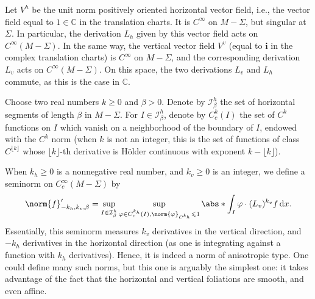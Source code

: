\documentclass[11pt, a4paper, oneside, final, pagebackref]{amsart}
\newcommand{\boI}{\mathcal{I}}
\newcommand{\C}{\mathbb{C}}
\newcommand{\dd}{\mathop{}\!\mathrm{d}}
\newcommand{\ic}{\mathbf{i}}
\renewcommand{\phi}{\varphi}
\renewcommand{\leq}{\leqslant}
\renewcommand{\geq}{\geqslant}
\theoremstyle{definition}
\numberwithin{equation}{section}
\begin{document}
Let $V^h$ be the unit norm positively oriented horizontal vector field, i.e.,
the vector field equal to $1 \in \C$ in the translation charts. It is
$C^\infty$ on $M-\Sigma$, but singular at $\Sigma$. In particular, the
derivation $L_h$ given by this vector field acts on $C^\infty(M-\Sigma)$. In
the same way, the vertical vector field $V^v$ (equal to $\ic$ in the complex
translation charts) is $C^\infty$ on $M-\Sigma$, and the corresponding
derivation $L_v$ acts on $C^\infty(M-\Sigma)$. On this space, the two
derivations $L_v$ and $L_h$ commute, as this is the case in $\C$.

Choose two real numbers $k\geq 0$ and $\beta >0$. Denote by $\boI^h_\beta$
the set of horizontal segments of length $\beta$ in $M-\Sigma$. For $I\in
\boI^h_\beta$, denote by $C^k_c(I)$ the set of $C^k$ functions on $I$ which
vanish on a neighborhood of the boundary of $I$, endowed with the $C^k$ norm
(when $k$ is not an integer, this is the set of functions of class
$C^{\lfloor k \rfloor}$ whose $\lfloor k \rfloor$-th derivative is H\"older
continuous with exponent $k-\lfloor k \rfloor$).

When $k_h\geq 0$ is a nonnegative real number, and $k_v\geq 0$ is an integer,
we define a seminorm on $C^\infty_c(M-\Sigma)$ by
\begin{equation*}
  \norm{f}'_{-k_h, k_v, \beta} =
    \sup_{I \in \boI^h_\beta} \sup_{\phi \in C^{k_h}_c(I),
    \norm{\phi}_{C^{k_h}} \leq 1} \abs*{\int_I \phi \cdot (L_v)^{k_v} f \dd x}.
\end{equation*}
Essentially, this seminorm measures $k_v$ derivatives in the vertical
direction, and $-k_h$ derivatives in the horizontal direction (as one is
integrating against a function with $k_h$ derivatives). Hence, it is indeed a
norm of anisotropic type. One could define many such norms, but this one is
arguably the simplest one: it takes advantage of the fact that the horizontal
and vertical foliations are smooth, and even affine.
\end{document}
